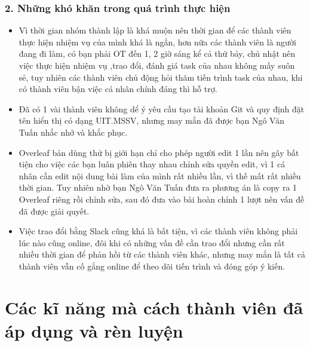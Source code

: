 \documentclass[12pt]{report}
\begin{document}
\subsection*{2. Những khó khăn trong quá trình thực hiện}
\begin{itemize}
    \item Vì thời gian nhóm thành lập là khá muộn nên thời gian để các thành viên thực hiện nhiệm vụ của mình khá là ngắn, hơn nữa các thành viên là người đang đi làm, có bạn phải OT đến 1, 2 giờ sáng kể cả thứ bảy, chủ nhật nên việc thực hiện nhiệm vụ ,trao đổi, đánh giá task của nhau không mấy suôn sẻ, tuy nhiên các thành viên chủ động hỏi thăm tiến trình task của nhau, khi có thành viên bận việc cá nhân chính đáng thì hỗ trợ.
    \item Đã có 1 vài thành viên không dể ý yêu cầu tạo tài khoản Git và quy định đặt tên hiển thị có dạng UIT.MSSV, nhưng may mắn đã được bạn Ngô Văn Tuấn nhắc nhở và khắc phục.
    \item  Overleaf bản dùng thử bị giới hạn chỉ cho phép người edit 1 lần nên gây bất tiện cho việc các bạn luân phiên thay nhau chỉnh sửa quyền edit, vì 1 cá nhân cần edit nội dung bài làm của mình rất nhiều lần, vì thế mất rất nhiều thời gian. Tuy nhiên nhờ bạn Ngô Văn Tuấn đưa ra phương án là copy ra 1 Overleaf riêng rồi chỉnh sửa, sau đó đưa vào bài hoàn chỉnh 1 lượt nên vấn đề đã được giải quyết.
    \item Việc trao đổi bằng Slack cũng khá là bất tiện, vì các thành viên không phải lúc nào cũng online, đôi khi có những vấn đề cần trao đổi nhưng cần rất nhiều thời gian để phản hồi từ các thành viên khác, nhưng may mắn là tất cả thành viên vẫn cố gắng online để theo dõi tiến trình và đóng góp ý kiến.

\end{itemize}


\chapter{Các kĩ năng mà cách thành viên đã áp dụng và rèn luyện}
\label{sec:used_skills}
\end{document}
